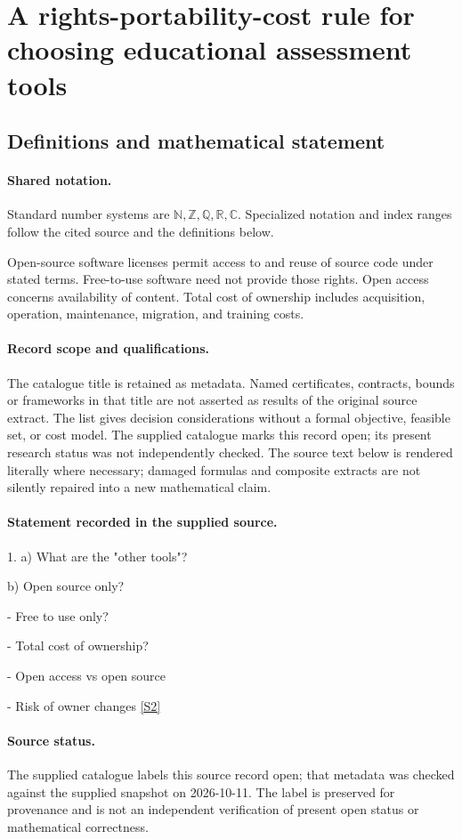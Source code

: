 \documentclass[11pt]{article}
\newcommand{\sref}[2]{\hyperlink{source:#1:#2}{[S#2]}}
\begin{document}
\section{A rights-portability-cost rule for choosing educational assessment tools}\label{statement}

\subsection{Definitions and mathematical statement}

\paragraph{Shared notation.}Standard number systems are $\mathbb N,\mathbb Z,\mathbb Q,\mathbb R,\mathbb C$. Specialized notation and index ranges follow the cited source and the definitions below.


Open-source software licenses permit access to and reuse of source code under stated terms. Free-to-use software need not provide those rights. Open access concerns availability of content. Total cost of ownership includes acquisition, operation, maintenance, migration, and training costs.
\paragraph{Record scope and qualifications.}
The catalogue title is retained as metadata. Named certificates, contracts, bounds or frameworks in that title are not asserted as results of the original source extract.
The list gives decision considerations without a formal objective, feasible set, or cost model. The supplied catalogue marks this record open; its present research status was not independently checked.
The source text below is rendered literally where necessary; damaged formulas and composite extracts are not silently repaired into a new mathematical claim.
\paragraph{Statement recorded in the supplied source.}
1. a) What are the "other tools"?

b) Open source only?

- Free to use only?

- Total cost of ownership?

- Open access vs open source

- Risk of owner changes \sref{statement}{2}
\paragraph{Source status.}
The supplied catalogue labels this source record open; that metadata was checked against the supplied snapshot on 2026-10-11. The label is preserved for provenance and is not an independent verification of present open status or mathematical correctness.
\end{document}
